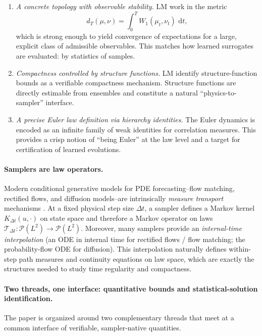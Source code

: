 \documentclass{article}
\numberwithin{equation}{section}
\theoremstyle{plain}
\theoremstyle{definition}
\theoremstyle{remark}
\newcommand{\Pcal}{\mathcal{P}}
\newcommand{\dd}{\,\mathrm{d}}
\begin{document}
\begin{enumerate}[label=(\roman*),leftmargin=2.2em]
\item \emph{A concrete topology with observable stability.}
LM work in the metric
\[
d_T(\mu,\nu)=\int_0^T W_1(\mu_t,\nu_t)\,\dd t,
\]
which is strong enough to yield convergence of expectations for a large, explicit class of admissible observables.
This matches how learned surrogates are evaluated: by statistics of samples.

\item \emph{Compactness controlled by structure functions.}
LM identify structure-function bounds as a verifiable compactness mechanism. Structure functions are directly estimable
from ensembles and constitute a natural ``physics-to-sampler'' interface.

\item \emph{A precise Euler law definition via hierarchy identities.}
The Euler dynamics is encoded as an infinite family of weak identities for correlation measures.
This provides a crisp notion of ``being Euler'' at the law level and a target for certification of learned evolutions.
\end{enumerate}





\paragraph{Samplers are law operators.}
Modern conditional generative models for PDE forecasting--flow matching, rectified flows, and diffusion models--are
intrinsically \emph{measure transport} mechanisms \cite{molinaro2024generative, armegioiu2025rectified, schiff2024dyslim, kohl2023benchmarking}.
At a fixed physical step size $\Delta t$, a sampler defines a Markov kernel $K_{\Delta t}(u,\cdot)$ on state space and
therefore a Markov operator on laws $\mathcal T_{\Delta t}:\Pcal(L^2)\to\Pcal(L^2)$.
Moreover, many samplers provide an \emph{internal-time interpolation} (an ODE in internal time for rectified flows / flow
matching; the probability-flow ODE for diffusion). This interpolation naturally defines within-step path measures and
continuity equations on law space, which are exactly the structures needed to study time regularity and compactness.

\paragraph{Two threads, one interface: quantitative bounds and statistical-solution identification.}
The paper is organized around two complementary threads that meet at a common interface of verifiable, sampler-native
quantities.
\end{document}

